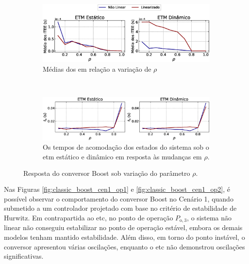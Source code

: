 \begin{figure}[H]
  \centering
  \captionsetup{justification=centering}
  \begin{subfigure}{1.\textwidth}
    \centering
    \includegraphics[width=1.\textwidth]{figuras/boost/itee-mean.eps}
    \caption{Médias dos  em relação a variação de $\rho$}
  \end{subfigure}
  \\[6pt]
  \begin{subfigure}{1.\textwidth} 
    \centering
    \includegraphics[width=1.\textwidth]{figuras/boost/ts.eps}
    \caption{Os tempos de acomodação dos estados do sistema sob o \acrshort{etm} estático e dinâmico em resposta às mudanças em $\rho$.}
  \end{subfigure}
  \caption{Resposta do conversor Boost sob variação do parâmetro $\rho$.}
  \label{fig:boost_converter_mu}
\end{figure}

Nas Figuras \ref{fig:classic_boost_cen1_op1} e \ref{fig:classic_boost_cen1_op2}, é possível observar o comportamento do conversor Boost no Cenário 1, quando submetido a um controlador projetado com base no critério de estabilidade de Hurwitz. Em contrapartida ao \acrshort{etc}, no ponto de operação $P_{\mathrm{o}, 3}$, o sistema não linear não conseguiu estabilizar no ponto de operação estável, embora os demais modelos tenham mantido estabilidade. Além disso, em torno do ponto instável, o conversor apresentou várias oscilações, enquanto o \acrshort{etc} não demonstrou oscilações significativas.

